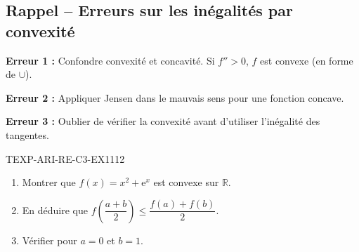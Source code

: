 

\subsection*{Rappel -- Erreurs sur les inégalités par convexité}

\textbf{Erreur 1 :} Confondre convexité et concavité. Si $f'' > 0$, $f$ est convexe (en forme de $\cup$).

\textbf{Erreur 2 :} Appliquer Jensen dans le mauvais sens pour une fonction concave.

\textbf{Erreur 3 :} Oublier de vérifier la convexité avant d'utiliser l'inégalité des tangentes.

\begin{exercice}{TEXP-ARI-RE-C3-EX1}{1}{12}
\begin{enumerate}
  \item Montrer que $f(x) = x^2 + \mathrm{e}^x$ est convexe sur $\mathbb{R}$.
  \item En déduire que $f\!\left(\dfrac{a+b}{2}\right) \leq \dfrac{f(a) + f(b)}{2}$.
  \item Vérifier pour $a = 0$ et $b = 1$.
\end{enumerate}
\end{exercice}

